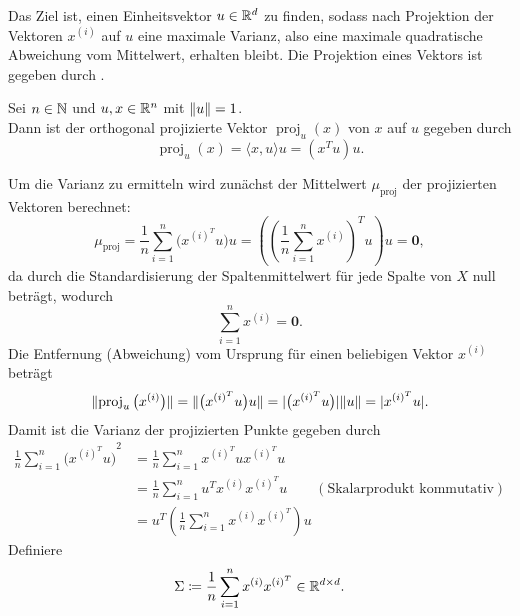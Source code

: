 Das Ziel ist, einen Einheitsvektor \(u \in \mathbb{R}^{d}\) zu finden, sodass nach Projektion der Vektoren \(x^{(i)}\) auf \(u\) eine maximale Varianz, also eine maximale quadratische Abweichung vom Mittelwert, erhalten bleibt.
Die Projektion eines Vektors ist gegeben durch .
\begin{repitition}\label{rep:proj}
    Sei \(n \in \mathbb{N}\) und \(u,x \in \mathbb{R}^{n}\) mit \(\lVert u\rVert = 1\).  \\
    Dann ist der orthogonal projizierte Vektor \(\operatorname{proj}_{u}(x)\) von \(x\) auf \(u\) gegeben durch
    \begin{equation*}
        \operatorname{proj}_{u}(x) = \langle x,u \rangle u = (x^{T}u)u.
    \end{equation*}     
\end{repitition}
Um die Varianz zu ermitteln wird zunächst der Mittelwert \(\mu_{\operatorname{proj}}\) der projizierten Vektoren berechnet:
\begin{equation*}
    \mu_{\operatorname{proj}} = \frac{1}{n}\sum_{i=1}^{n}\big(x^{{(i)}^{T}}u\big)u = \left({\left(\frac{1}{n}\sum_{i=1}^{n}x^{(i)}\right)}^{T}u\right)u = \symbf{0},
\end{equation*}
da durch die Standardisierung der Spaltenmittelwert für jede Spalte von \(X\) null beträgt, wodurch
\begin{equation*}
    \sum_{i=1}^{n}x^{(i)} = \symbf{0}.
\end{equation*}
Die Entfernung (Abweichung) vom Ursprung für einen beliebigen Vektor \(x^{(i)}\) beträgt
\begin{equation*}
    \lVert\operatorname{proj}_{u}\big(x^{(i)}\big)\rVert = \lVert\big(x^{{(i)}^{T}}u\big)u\rVert =  \lvert\big(x^{{(i)}^{T}}u\big)\rvert\lVert u\rVert = \lvert x^{{(i)}^{T}}u\rvert.
\end{equation*}
Damit ist die Varianz der projizierten Punkte gegeben durch 
\begin{align*}
    \frac{1}{n}\sum_{i=1}^{n}{\big(x^{{(i)}^{T}}u\big)}^{2} &= \frac{1}{n}\sum_{i=1}^{n}x^{{(i)}^{T}}ux^{{(i)}^{T}}u \\
    &= \frac{1}{n}\sum_{i=1}^{n}u^{T}x^{(i)}x^{{(i)}^{T}}u \qquad (\text{Skalarprodukt kommutativ})\\
    &= u^{T}\left(\frac{1}{n}\sum_{i=1}^{n}x^{(i)}x^{{(i)}^{T}}\right)u
\end{align*}
Definiere 
\begin{equation*}
    \Sigma \coloneqq \frac{1}{n}\sum_{i=1}^{n}x^{(i)}x^{{(i)}^{T}} \in \mathbb{R}^{d \times d}.
\end{equation*}
